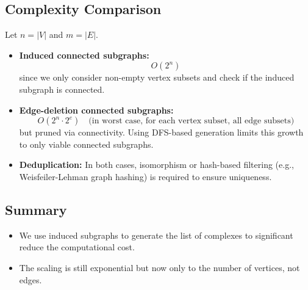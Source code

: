 \documentclass{article}
\begin{document}
\subsection*{Complexity Comparison}

Let \( n = |V| \) and \( m = |E| \).

\begin{itemize}
    \item \textbf{Induced connected subgraphs:}
    \[
    O(2^n)
    \]
    since we only consider non-empty vertex subsets and check if the induced subgraph is connected.

    \item \textbf{Edge-deletion connected subgraphs:}
    \[
    O(2^n \cdot 2^e) \quad \text{(in worst case, for each vertex subset, all edge subsets)}
    \]
    but pruned via connectivity. Using DFS-based generation limits this growth to only viable connected subgraphs.

    \item \textbf{Deduplication:} In both cases, isomorphism or hash-based filtering (e.g., Weisfeiler-Lehman graph hashing) is required to ensure uniqueness.
\end{itemize}

\subsection*{Summary}

\begin{itemize}
    \item We use induced subgraphs to generate the list of complexes to significant reduce the computational cost.
    \item The scaling is still exponential but now only to the number of vertices, not edges.
\end{itemize}
\end{document}
